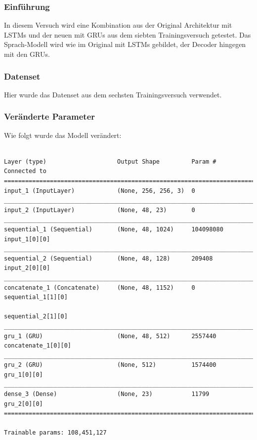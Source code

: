 \documentclass[pdftex,a4paper,halfparskip, article]{scrartcl}
\begin{document}


\subsubsection*{Einführung}

In diesem Versuch wird eine Kombination aus der Original Architektur mit LSTMs und der neuen mit GRUs aus dem siebten Trainingsversuch getestet. Das Sprach-Modell wird wie im Original mit LSTMs gebildet, der Decoder hingegen mit den GRUs. 

\subsubsection*{Datenset}

Hier wurde das Datenset aus dem sechsten Trainingsversuch verwendet.

\subsubsection*{Veränderte Parameter}

Wie folgt wurde das Modell verändert:
\begin{verbatim}

Layer (type)                    Output Shape         Param #     Connected to
================================================================================
input_1 (InputLayer)            (None, 256, 256, 3)  0
________________________________________________________________________________
input_2 (InputLayer)            (None, 48, 23)       0
________________________________________________________________________________
sequential_1 (Sequential)       (None, 48, 1024)     104098080   input_1[0][0]
________________________________________________________________________________
sequential_2 (Sequential)       (None, 48, 128)      209408      input_2[0][0]
________________________________________________________________________________
concatenate_1 (Concatenate)     (None, 48, 1152)     0           sequential_1[1][0]
                                                                 sequential_2[1][0]
________________________________________________________________________________
gru_1 (GRU)                     (None, 48, 512)      2557440     concatenate_1[0][0]
________________________________________________________________________________
gru_2 (GRU)                     (None, 512)          1574400     gru_1[0][0]
________________________________________________________________________________
dense_3 (Dense)                 (None, 23)           11799       gru_2[0][0]
================================================================================

Trainable params: 108,451,127

\end{verbatim}
\end{document}
